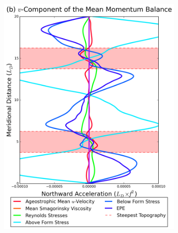 \documentclass[12pt,a4paper]{report}
\begin{document}
\begin{figure}
\begin{subfigure}{0.46\linewidth}
 		\includegraphics[width=\linewidth ]{vmom_2}
 		\label{fig:vmomlayer2}
 	\end{subfigure}
 	\begin{subfigure}{0.46\linewidth}
 		\centering

\end{subfigure}
\end{figure}
\end{document}
